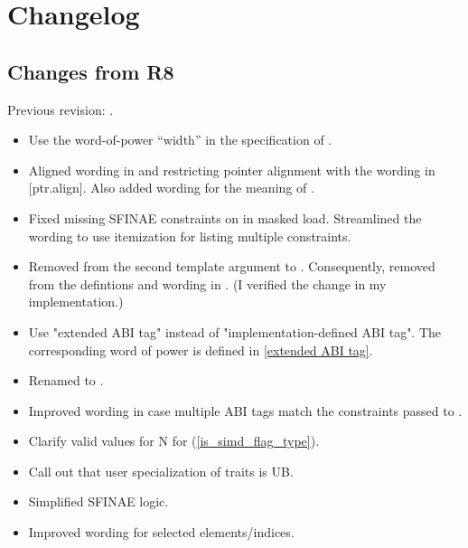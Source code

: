 \section{Changelog}
\subsection{Changes from R8}
Previous revision: \parencite{P0214R8}.
\begin{itemize}
  \item Use the word-of-power “width” in the specification of .

  \item Aligned wording in  and  restricting pointer alignment with the wording in [ptr.align].
    Also added wording for the meaning of .

  \item Fixed missing SFINAE constraints on  in masked load.
    Streamlined the wording to use itemization for listing multiple constraints.

  \item Removed  from the second template argument to .
    Consequently, removed  from the defintions and wording in .
    (I verified the change in my implementation.)

  \item Use "extended ABI tag" instead of "implementation-defined ABI tag". The corresponding word of power is defined in \ref{extended ABI tag}.

  \item Renamed  to .

  \item Improved wording in case multiple ABI tags match the constraints passed to .

  \item Clarify valid values for \code N for  (\ref{is_simd_flag_type}).

  \item Call out that user specialization of traits is UB.

  \item Simplified  SFINAE logic.

  \item Improved wording for selected elements/indices.


\end{itemize}
